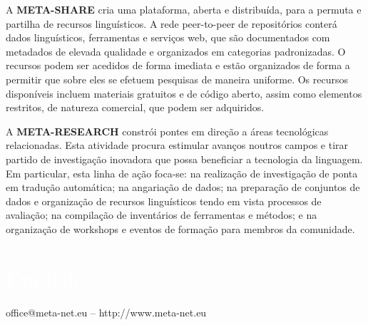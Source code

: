 \begin{multicols}{2}
A \textbf{META-SHARE} cria uma plataforma, aberta e distribuída, para a permuta e partilha de recursos linguísticos. A rede peer-to-peer de repositórios conterá dados linguísticos, ferramentas e serviços web, que são documentados com metadados de elevada qualidade e organizados em categorias padronizadas. O recursos podem ser acedidos de forma imediata e estão organizados de forma a permitir que sobre eles se efetuem pesquisas de maneira uniforme. Os recursos disponíveis incluem materiais gratuitos e de código aberto, assim como elementos restritos, de natureza comercial, que podem ser adquiridos.

A \textbf{META-RESEARCH} constrói pontes em direção a áreas tecnológicas relacionadas. Esta atividade procura estimular avanços noutros campos e tirar partido de investigação inovadora que possa beneficiar a tecnologia da linguagem. Em particular, esta linha de ação foca-se: na realização de investigação de ponta em tradução automática; na angariação de dados; na preparação de conjuntos de dados e organização de recursos linguísticos tendo em vista processos de avaliação; na compilação de inventários de ferramentas e métodos; e na organização de workshops e eventos de formação para membros da comunidade. 

\end{multicols}

\vfill

\makeatletter
{}
{
  \renewcommand*{\theHsection}{\thepart.\thesection}
}
\makeatother
\part*{\textcolor{white}{English}}
\setcounter{section}{0}
\setcounter{figure}{0}

\centerline{office@meta-net.eu -- http://www.meta-net.eu}


\cleardoublepage



